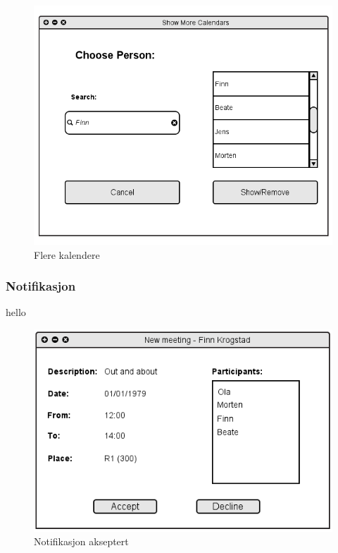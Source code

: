 \begin{figure}[H]
\centering
\includegraphics[scale=0.5]{images/flerekalendere.png}
\caption{Flere kalendere}
\label{flerekalendere_image}
\end{figure}

\subsubsection{Notifikasjon}
hello

\begin{figure}[H]
\centering
\includegraphics[scale=0.65]{images/notifikasjon_akseptert.png}
\caption{Notifikasjon akseptert}
\label{notifikasjon_akseptert_image}
\end{figure}

